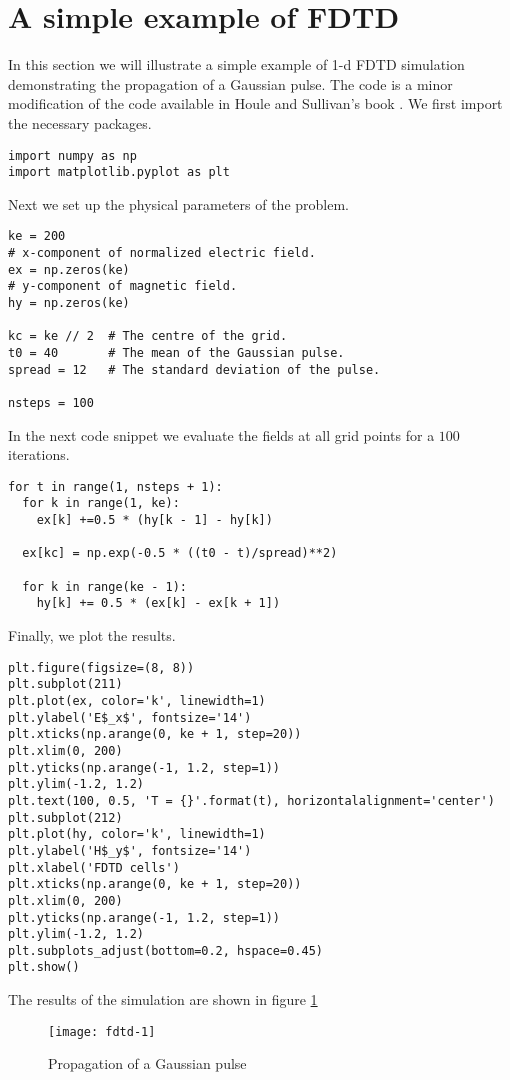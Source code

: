 \documentclass[11pt]{article}
\numberwithin{equation}{section}
\begin{document}
\section{A simple example of FDTD}\label{s7}
In this section we will illustrate a simple example of 1-d FDTD simulation
demonstrating the propagation of a Gaussian pulse. The code is a minor 
modification of the code available in Houle and Sullivan's book 
\cite{sullivan2013electromagnetic}. We first import the necessary packages.
\begin{verbatim}
import numpy as np
import matplotlib.pyplot as plt
\end{verbatim}
Next we set up the physical parameters of the problem.
\begin{verbatim}
ke = 200
# x-component of normalized electric field.
ex = np.zeros(ke)
# y-component of magnetic field.
hy = np.zeros(ke)

kc = ke // 2  # The centre of the grid.
t0 = 40       # The mean of the Gaussian pulse.
spread = 12   # The standard deviation of the pulse.

nsteps = 100
\end{verbatim}
In the next code snippet we evaluate the fields at all grid points for a 
$100$ iterations.
\begin{verbatim}
for t in range(1, nsteps + 1):
  for k in range(1, ke):
    ex[k] +=0.5 * (hy[k - 1] - hy[k])

  ex[kc] = np.exp(-0.5 * ((t0 - t)/spread)**2)

  for k in range(ke - 1):
    hy[k] += 0.5 * (ex[k] - ex[k + 1])
\end{verbatim}
Finally, we plot the results.
\begin{verbatim}
plt.figure(figsize=(8, 8))
plt.subplot(211)
plt.plot(ex, color='k', linewidth=1)
plt.ylabel('E$_x$', fontsize='14')
plt.xticks(np.arange(0, ke + 1, step=20))
plt.xlim(0, 200)
plt.yticks(np.arange(-1, 1.2, step=1))
plt.ylim(-1.2, 1.2)
plt.text(100, 0.5, 'T = {}'.format(t), horizontalalignment='center')
plt.subplot(212)
plt.plot(hy, color='k', linewidth=1)
plt.ylabel('H$_y$', fontsize='14')
plt.xlabel('FDTD cells')
plt.xticks(np.arange(0, ke + 1, step=20))
plt.xlim(0, 200)
plt.yticks(np.arange(-1, 1.2, step=1))
plt.ylim(-1.2, 1.2)
plt.subplots_adjust(bottom=0.2, hspace=0.45)
plt.show()
\end{verbatim}
The results of the simulation are shown in figure \ref{f2}
\begin{figure}
\centering
\texttt{[image: fdtd-1]}
\caption{Propagation of a Gaussian pulse}\label{f2}
\end{figure}
\end{document}
